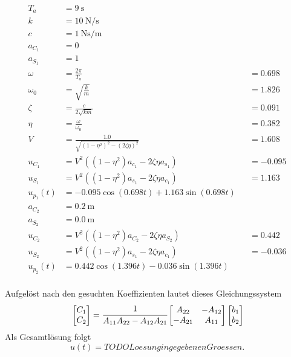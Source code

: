 \begin{solution}
    \begin{align*}
        T_a &= \SI{9}{\second} \\
        k &=  \SI{10}{\newton \per \second} \\
        c &= \SI{1}{\newton \second \per \meter} \\
        a_{C_1} &= 0 \\
        a_{S_1} &= 1 \\
        \omega &= \frac{2 \pi}{T_a} &&= 0.698 \\
        \omega_0 &= \sqrt{\frac{k}{m}} &&= 1.826\\
        \zeta &= \frac{c}{2 \sqrt{km}} &&= 0.091\\
        \eta &= \frac{\omega}{\omega_0} &&= 0.382\\
        V &= \frac{1.0}{\sqrt{(1-\eta^2)^2 - (2 \zeta \eta)^2}} &&= 1.608\\
        u_{C_1}  &= V^2 ((1-\eta^2) a_{c_1} - 2 \zeta \eta a_{s_1}) &&= -0.095 \\ 
        u_{S_1} &= V^2 ((1-\eta^2) a_{s_1} - 2 \zeta \eta a_{c_1}) &&= 1.163 \\  
        u_{p_1}(t) &= -0.095 \cos(0.698 t) + 1.163 \sin(0.698 t)\\
        a_{C_2} &= \SI{0.2}{\meter} \\
        a_{S_2} &= \SI{0.0}{\meter} \\
        u_{C_2} &= V^2 ((1-\eta^2) a_{C_2} - 2 \zeta \eta a_{S_2}) &&= 0.442\\
        u_{S_2} &= V^2 ((1-\eta^2) a_{s_1} - 2 \zeta \eta a_{c_1}) &&= -0.036\\
        u_{p_2}(t) &= 0.442 \cos(1.396t) -0.036 \sin(1.396 t) \\
    \end{align*}

    Aufgelöst nach den gesuchten Koeffizienten lautet dieses Gleichungssystem
    \begin{align*}
    &\begin{bmatrix}
    C_1 \\
    C_2
    \end{bmatrix}
    = \cfrac{1}{A_{11}A_{22}-A_{12}A_{21}}
    \begin{bmatrix}
     A_{22} & -A_{12}\\
     -A_{21} & A_{11}
    \end{bmatrix}
    \begin{bmatrix}
     b_1 \\
     b_2
    \end{bmatrix}\\
 \end{align*}
 Als Gesamtlösung folgt
 \begin{equation*}
 u(t)=TODO Loesung in gegebenen Groessen.  
 \end{equation*}

\end{solution}
